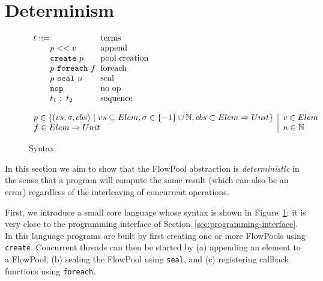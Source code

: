 \section{Determinism}

\smallrulenames

\begin{figure}[t]


$\ba[t]{l@{\hspace{2mm}}l}
t    ::=                                                           & \mbox{terms}              \\
\gap p << v                                                  & \mbox{append}           \\
\gap \texttt{create}~p                                   & \mbox{pool creation}  \\
\gap p~\texttt{foreach}~f                             & \mbox{foreach}           \\
\gap p~\texttt{seal}~n                                  & \mbox{seal}                \\
\gap \texttt{nop}                                          & \mbox{no op}              \\
\gap t_1~;~t_2                                               & \mbox{sequence}        \\
\ea$

$\ba{l@{\hspace{2mm}}|@{\hspace{2mm}}l@{\hspace{2mm}}l}
p \in \set{(vs, \sigma, cbs)~|~vs \subseteq Elem, \sigma \in \set{-1} \cup \mathbb{N}, cbs \subset Elem \Rightarrow Unit} & v \in Elem \\
f \in Elem \Rightarrow Unit & n \in \mathbb{N}
\ea$


\caption{Syntax}\label{fig:syntax}
\end{figure}

In this section we aim to show that the FlowPool abstraction is \emph{deterministic} in the sense that a program will compute the same result (which can also be an error) regardless of the interleaving of concurrent operations.

First, we introduce a small core language whose syntax is shown in Figure~\ref{fig:syntax}; it is very close to the programming interface of Section~\ref{sec:programming-interface}. In this language programs are built by first creating one or more FlowPools using \texttt{create}. Concurrent threads can then be started by (a) appending an element to a FlowPool, (b) sealing the FlowPool using \texttt{seal}, and (c) registering callback functions using \texttt{foreach}.

